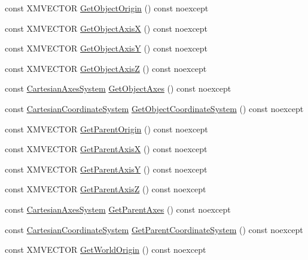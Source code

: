 \begin{DoxyCompactItemize}
\item 
const X\+M\+V\+E\+C\+T\+OR \hyperlink{structmage_1_1_transform_node_a5f97b639779c4b9d24e144f1d8c9da12}{Get\+Object\+Origin} () const noexcept
\item 
const X\+M\+V\+E\+C\+T\+OR \hyperlink{structmage_1_1_transform_node_a0e31d129c0a6524a612ce28db24f0600}{Get\+Object\+AxisX} () const noexcept
\item 
const X\+M\+V\+E\+C\+T\+OR \hyperlink{structmage_1_1_transform_node_ad595911b6df1898a49263eb8e201d00c}{Get\+Object\+AxisY} () const noexcept
\item 
const X\+M\+V\+E\+C\+T\+OR \hyperlink{structmage_1_1_transform_node_a12e14a4d519295d6d1fb2b839061ef20}{Get\+Object\+AxisZ} () const noexcept
\item 
const \hyperlink{structmage_1_1_cartesian_axes_system}{Cartesian\+Axes\+System} \hyperlink{structmage_1_1_transform_node_a3e6b79b7e1a0844d8f93acaecdf65346}{Get\+Object\+Axes} () const noexcept
\item 
const \hyperlink{structmage_1_1_cartesian_coordinate_system}{Cartesian\+Coordinate\+System} \hyperlink{structmage_1_1_transform_node_a59417bfb21810840f90cee6a192e6ffd}{Get\+Object\+Coordinate\+System} () const noexcept
\item 
const X\+M\+V\+E\+C\+T\+OR \hyperlink{structmage_1_1_transform_node_a22a853447eaf646db3522e7f4093ae01}{Get\+Parent\+Origin} () const noexcept
\item 
const X\+M\+V\+E\+C\+T\+OR \hyperlink{structmage_1_1_transform_node_ac562bb1036c0bc55c0ededd8fa956fda}{Get\+Parent\+AxisX} () const noexcept
\item 
const X\+M\+V\+E\+C\+T\+OR \hyperlink{structmage_1_1_transform_node_a5d5138bb149828fa78da166129f996b1}{Get\+Parent\+AxisY} () const noexcept
\item 
const X\+M\+V\+E\+C\+T\+OR \hyperlink{structmage_1_1_transform_node_a65188d5be4f0bc4ff8bd822b659309cc}{Get\+Parent\+AxisZ} () const noexcept
\item 
const \hyperlink{structmage_1_1_cartesian_axes_system}{Cartesian\+Axes\+System} \hyperlink{structmage_1_1_transform_node_a65a2b2cef7a43dfce2e523f78d5eeb13}{Get\+Parent\+Axes} () const noexcept
\item 
const \hyperlink{structmage_1_1_cartesian_coordinate_system}{Cartesian\+Coordinate\+System} \hyperlink{structmage_1_1_transform_node_af99de109dd3e211fdc5f06a65ccc1e89}{Get\+Parent\+Coordinate\+System} () const noexcept
\item 
const X\+M\+V\+E\+C\+T\+OR \hyperlink{structmage_1_1_transform_node_a481e03769590d147bbdf7dedf56a6e65}{Get\+World\+Origin} () const noexcept

\end{DoxyCompactItemize}
